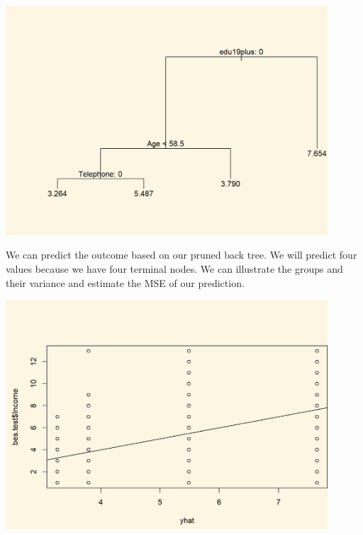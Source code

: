\documentclass[]{article}
\newenvironment{Shaded}{\begin{snugshade}}{\end{snugshade}}
\newcommand{\CommentTok}[1]{\textcolor[rgb]{0.56,0.35,0.01}{\textit{#1}}}
\newcommand{\DataTypeTok}[1]{\textcolor[rgb]{0.13,0.29,0.53}{#1}}
\newcommand{\DecValTok}[1]{\textcolor[rgb]{0.00,0.00,0.81}{#1}}
\newcommand{\KeywordTok}[1]{\textcolor[rgb]{0.13,0.29,0.53}{\textbf{#1}}}
\newcommand{\NormalTok}[1]{#1}
\newcommand{\OperatorTok}[1]{\textcolor[rgb]{0.81,0.36,0.00}{\textbf{#1}}}
\newcommand{\StringTok}[1]{\textcolor[rgb]{0.31,0.60,0.02}{#1}}
\begin{document}
\includegraphics[width=0.9\textwidth,height=\textheight]{./img/unnamed-chunk-154-1.png}

We can predict the outcome based on our pruned back tree. We will predict four values because we have four terminal nodes. We can illustrate the groups and their variance and estimate the MSE of our prediction.

\begin{Shaded}
\end{Shaded}

\includegraphics[width=0.9\textwidth,height=\textheight]{./img/unnamed-chunk-155-1.png}
\end{document}
